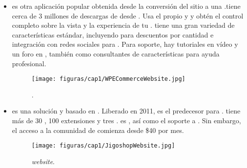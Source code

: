 \begin{itemize}
	\item \textbf{\nameWPECommerce} es otra aplicación popular obtenida desde la conversión del  sitio \wordPressNAME a una \ecommerceCOM \store.\nameWPECommerce tiene cerca de 3 millones de descargas de \pluginAS desde \wordPressOrg\cite{online_WordPress}. Usa el propio \htmlNAME y \cssNAME y obtén el control completo sobre la vista y la experiencia de tu \online \store. \nameWPECommerce tiene una gran variedad de características estándar, incluyendo \multiTierPricing para descuentos por cantidad e integración con redes sociales para \marketing. Para soporte, hay tutoriales en vídeo y un foro en \wordPressOrg, también como consultantes de características para ayuda profesional.

	\begin{figure}[H]
		\centering
		\texttt{[image: figuras/cap1/WPECommerceWebsite.jpg]}
		\caption{\nameWPECommerce \websiteINT \cite{online_WPECommerce}.}
	\end{figure}

	\item \textbf{\nameJigoshop} es una solución \ecommerceCOM \freePC y \openSourcePC basado en \wordPressNAME. Liberado en 2011, \nameJigoshop es el predecesor para \nameWooCommerce. \nameJigoshop tiene más de 30 \themesCPT, 100 extensiones y tres \themeCPT \frameworksPC. \nameJigoshop es \freePC, así como el soporte a \wordPressOrg. Sin embargo, el acceso a la comunidad de \nameJigoshop comienza desde \$40 por mes.

	\begin{figure}[H]
		\centering
		\texttt{[image: figuras/cap1/JigoshopWebsite.jpg]}
		\caption{\nameJigoshop \textit{website}\cite{online_Jigoshop}.}
	\end{figure}

\end{itemize}



%

